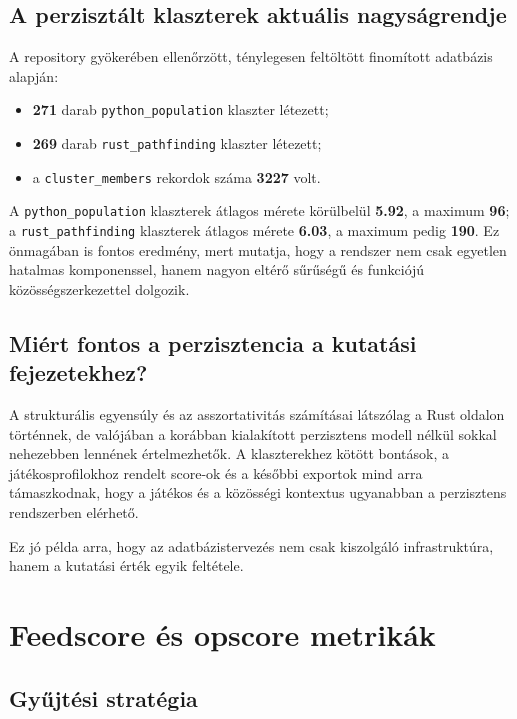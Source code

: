 \documentclass[a4paper,12pt]{report}
\begin{document}
\section{A perzisztált klaszterek aktuális nagyságrendje}

A repository gyökerében ellenőrzött, ténylegesen feltöltött finomított adatbázis alapján:

\begin{itemize}
    \item \textbf{271} darab \texttt{python\_population} klaszter létezett;
    \item \textbf{269} darab \texttt{rust\_pathfinding} klaszter létezett;
    \item a \texttt{cluster\_members} rekordok száma \textbf{3227} volt.
\end{itemize}

A \texttt{python\_population} klaszterek átlagos mérete körülbelül \textbf{5.92}, a maximum \textbf{96}; a \texttt{rust\_pathfinding} klaszterek átlagos mérete \textbf{6.03}, a maximum pedig \textbf{190}. Ez önmagában is fontos eredmény, mert mutatja, hogy a rendszer nem csak egyetlen hatalmas komponenssel, hanem nagyon eltérő sűrűségű és funkciójú közösségszerkezettel dolgozik.

\section{Miért fontos a perzisztencia a kutatási fejezetekhez?}

A strukturális egyensúly és az asszortativitás számításai látszólag a Rust oldalon történnek, de valójában a korábban kialakított perzisztens modell nélkül sokkal nehezebben lennének értelmezhetők. A klaszterekhez kötött bontások, a játékosprofilokhoz rendelt score-ok és a későbbi exportok mind arra támaszkodnak, hogy a játékos és a közösségi kontextus ugyanabban a perzisztens rendszerben elérhető.

Ez jó példa arra, hogy az adatbázistervezés nem csak kiszolgáló infrastruktúra, hanem a kutatási érték egyik feltétele.

\chapter{Feedscore és opscore metrikák}

\section{Gyűjtési stratégia}
\end{document}
